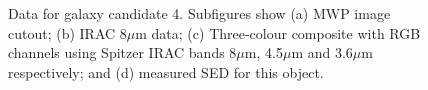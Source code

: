\documentclass[times,usenatbib]{mn2e}
\begin{document}
\begin{figure}
\begin{center}
\caption{Data for galaxy candidate 4. Subfigures show (a) MWP image cutout; (b) IRAC 8$\mu$m data; (c) Three-colour composite with RGB channels using Spitzer IRAC bands 8$\mu$m, 4.5$\mu$m and 3.6$\mu$m respectively; and (d) measured SED for this object.}
\label{gal4}
\end{center}
\end{figure} 
\end{document}
